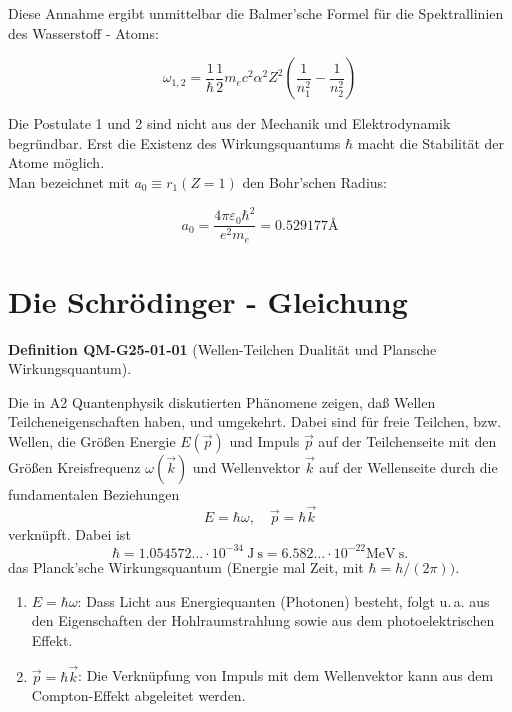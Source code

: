 \documentclass[10pt, letterpaper]{article}
\newcommand{\CustomHeading}[3]{%
  \par\medskip\noindent%
  \textbf{#1 #2} \textnormal{(#3)}.\enskip%
}
\newenvironment{DEF}[2]{\begin{unitbox}\CustomHeading{Definition}{#1}{#2}}{\end{unitbox}}
\begin{document}
Diese Annahme ergibt unmittelbar die Balmer'sche Formel für die Spektrallinien des Wasserstoff - Atoms:

$$
\omega_{1,2}=\frac{1}{\hbar} \frac{1}{2} m_{e} c^{2} \alpha^{2} Z^{2}\left(\frac{1}{n_{1}^{2}}-\frac{1}{n_{2}^{2}}\right)
$$

Die Postulate 1 und 2 sind nicht aus der Mechanik und Elektrodynamik begründbar. Erst die Existenz des Wirkungsquantums $\hbar$ macht die Stabilität der Atome möglich.\\
Man bezeichnet mit $a_{0} \equiv r_{1}(Z=1)$ den Bohr'schen Radius:

$$
a_{0}=\frac{4 \pi \varepsilon_{0} \hbar^{2}}{e^{2} m_{e}}=0.529177 \text{\AA}
$$










\pagebreak



\section{Die Schrödinger - Gleichung}



\begin{DEF}{QM-G25-01-01}{Wellen-Teilchen Dualität und Plansche Wirkungsquantum}
Die in A2 Quantenphysik diskutierten Phänomene zeigen, daß Wellen Teilcheneigenschaften haben, und umgekehrt. Dabei sind für freie Teilchen, bzw. Wellen, die Größen Energie $E(\vec{p})$ und Impuls $\vec{p}$ auf der Teilchenseite mit den Größen Kreisfrequenz $\omega(\vec{k})$ und Wellenvektor $\vec{k}$ auf der Wellenseite durch die fundamentalen Beziehungen
$$
E=\hbar \omega, \quad \vec{p}=\hbar \vec{k}
$$
verknüpft. Dabei ist
$$
\hbar=1.054572 \ldots \cdot 10^{-34} \mathrm{~J} \mathrm{~s}=6.582 \ldots \cdot 10^{-22} \mathrm{MeV} \mathrm{~s} .
$$
das Planck'sche Wirkungsquantum (Energie mal Zeit, mit $\hbar=h /(2 \pi))$.
\begin{enumerate}
  \item $E = \hbar \omega$: Dass Licht aus Energiequanten (Photonen) besteht, folgt u.\,a. aus den Eigenschaften der Hohlraumstrahlung sowie aus dem photoelektrischen Effekt.
  \item $\vec{p} = \hbar \vec{k}$: Die Verknüpfung von Impuls mit dem Wellenvektor kann aus dem Compton-Effekt abgeleitet werden.
\end{enumerate}
\end{DEF}
\end{document}
